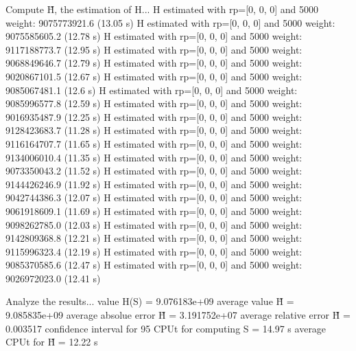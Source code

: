 Compute H̃, the estimation of H...
  H estimated with rp=[0, 0, 0] and 5000 weight:  9075773921.6  (13.05 s)
  H estimated with rp=[0, 0, 0] and 5000 weight:  9075585605.2  (12.78 s)
  H estimated with rp=[0, 0, 0] and 5000 weight:  9117188773.7  (12.95 s)
  H estimated with rp=[0, 0, 0] and 5000 weight:  9068849646.7  (12.79 s)
  H estimated with rp=[0, 0, 0] and 5000 weight:  9020867101.5  (12.67 s)
  H estimated with rp=[0, 0, 0] and 5000 weight:  9085067481.1  (12.6 s)
  H estimated with rp=[0, 0, 0] and 5000 weight:  9085996577.8  (12.59 s)
  H estimated with rp=[0, 0, 0] and 5000 weight:  9016935487.9  (12.25 s)
  H estimated with rp=[0, 0, 0] and 5000 weight:  9128423683.7  (11.28 s)
  H estimated with rp=[0, 0, 0] and 5000 weight:  9116164707.7  (11.65 s)
  H estimated with rp=[0, 0, 0] and 5000 weight:  9134006010.4  (11.35 s)
  H estimated with rp=[0, 0, 0] and 5000 weight:  9073350043.2  (11.52 s)
  H estimated with rp=[0, 0, 0] and 5000 weight:  9144426246.9  (11.92 s)
  H estimated with rp=[0, 0, 0] and 5000 weight:  9042744386.3  (12.07 s)
  H estimated with rp=[0, 0, 0] and 5000 weight:  9061918609.1  (11.69 s)
  H estimated with rp=[0, 0, 0] and 5000 weight:  9098262785.0  (12.03 s)
  H estimated with rp=[0, 0, 0] and 5000 weight:  9142809368.8  (12.21 s)
  H estimated with rp=[0, 0, 0] and 5000 weight:  9115996323.4  (12.19 s)
  H estimated with rp=[0, 0, 0] and 5000 weight:  9085370585.6  (12.47 s)
  H estimated with rp=[0, 0, 0] and 5000 weight:  9026972023.0  (12.41 s)

Analyze the results...
  value H(S)                  = 9.076183e+09 
  average value H̃             = 9.085835e+09 
  average absolue error H̃     = 3.191752e+07 
  average relative error H̃    = 0.003517 
  confidence interval for 95%
  CPUt for computing S         = 14.97 s
  average CPUt for H̃           = 12.22 s

